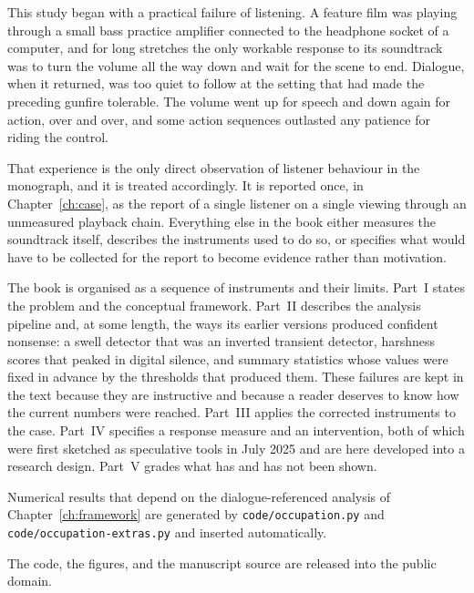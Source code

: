This study began with a practical failure of listening. A feature film was playing through a small bass practice amplifier connected to the headphone socket of a computer, and for long stretches the only workable response to its soundtrack was to turn the volume all the way down and wait for the scene to end. Dialogue, when it returned, was too quiet to follow at the setting that had made the preceding gunfire tolerable. The volume went up for speech and down again for action, over and over, and some action sequences outlasted any patience for riding the control.

That experience is the only direct observation of listener behaviour in the monograph, and it is treated accordingly. It is reported once, in Chapter~\ref{ch:case}, as the report of a single listener on a single viewing through an unmeasured playback chain. Everything else in the book either measures the soundtrack itself, describes the instruments used to do so, or specifies what would have to be collected for the report to become evidence rather than motivation.

The book is organised as a sequence of instruments and their limits. Part~I states the problem and the conceptual framework. Part~II describes the analysis pipeline and, at some length, the ways its earlier versions produced confident nonsense: a swell detector that was an inverted transient detector, harshness scores that peaked in digital silence, and summary statistics whose values were fixed in advance by the thresholds that produced them. These failures are kept in the text because they are instructive and because a reader deserves to know how the current numbers were reached. Part~III applies the corrected instruments to the case. Part~IV specifies a response measure and an intervention, both of which were first sketched as speculative tools in July 2025 and are here developed into a research design. Part~V grades what has and has not been shown.

Numerical results that depend on the dialogue-referenced analysis of Chapter~\ref{ch:framework} are generated by \texttt{code/occupation.py} and \texttt{code/occupation-extras.py} and inserted automatically. 

The code, the figures, and the manuscript source are released into the public domain.
